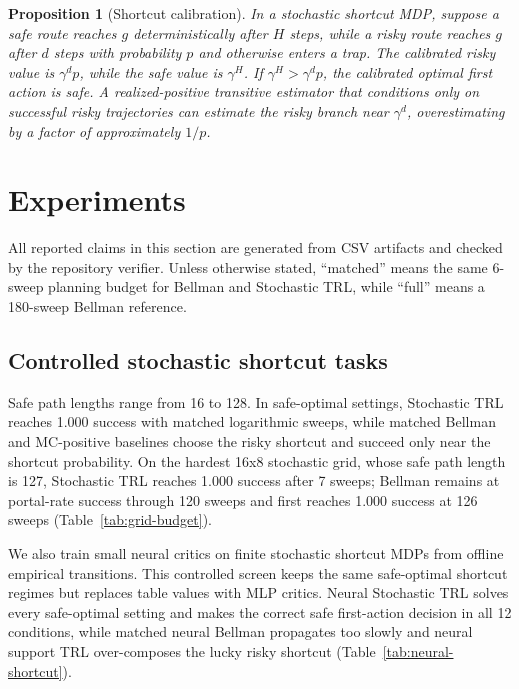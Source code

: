 \documentclass[10pt]{article}
\newtheorem{proposition}{Proposition}
\begin{document}
\begin{proposition}[Shortcut calibration]
In a stochastic shortcut MDP, suppose a safe route reaches $g$ deterministically
after $H$ steps, while a risky route reaches $g$ after $d$ steps with
probability $p$ and otherwise enters a trap. The calibrated risky value is
$\gamma^d p$, while the safe value is $\gamma^H$. If
$\gamma^H>\gamma^d p$, the calibrated optimal first action is safe. A
realized-positive transitive estimator that conditions only on successful
risky trajectories can estimate the risky branch near $\gamma^d$, overestimating
by a factor of approximately $1/p$.
\end{proposition}

\section{Experiments}

All reported claims in this section are generated from CSV artifacts and
checked by the repository verifier. Unless otherwise stated, ``matched'' means
the same 6-sweep planning budget for Bellman and Stochastic TRL, while
``full'' means a 180-sweep Bellman reference.

\subsection{Controlled stochastic shortcut tasks}

Safe path lengths range from 16 to 128. In safe-optimal settings, Stochastic
TRL reaches 1.000 success with matched logarithmic sweeps, while matched
Bellman and MC-positive baselines choose the risky shortcut and succeed only
near the shortcut probability. On the hardest 16x8 stochastic grid, whose safe
path length is 127, Stochastic TRL reaches 1.000 success after 7 sweeps;
Bellman remains at portal-rate success through 120 sweeps and first reaches
1.000 success at 126 sweeps (Table~\ref{tab:grid-budget}).

We also train small neural critics on finite stochastic shortcut MDPs from
offline empirical transitions. This controlled screen keeps the same
safe-optimal shortcut regimes but replaces table values with MLP critics.
Neural Stochastic TRL solves every safe-optimal setting and makes the correct
safe first-action decision in all 12 conditions, while matched neural Bellman
propagates too slowly and neural support TRL over-composes the lucky risky
shortcut (Table~\ref{tab:neural-shortcut}).
\end{document}

